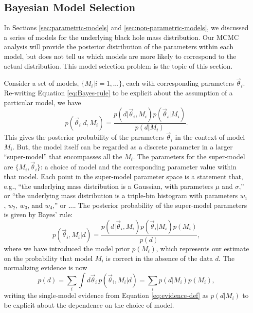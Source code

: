 \documentclass[preprint]{aastex}
\newcommand{\vtheta}{\vec{\theta}}
\begin{document}
\subsection{Bayesian Model Selection}
\label{sec:model-selection}

In Sections \ref{sec:parametric-models} and
\ref{sec:non-parametric-models}, we discussed a series of models for
the underlying black hole mass distribution.  Our MCMC analysis will
provide the posterior distribution of the parameters within each
model, but does not tell us which models are more likely to correspond
to the actual distribution.  This model selection problem is the topic
of this section.

Consider a set of models, $\{M_i| i = 1, \ldots\}$, each with
corresponding parameters $\vtheta_i$.  Re-writing Equation
\eqref{eq:Bayes-rule} to be explicit about the assumption of a
particular model, we have
\begin{equation}
  p(\vtheta_i | d, M_i) = \frac{p(d|\vtheta_i, M_i) p(\vtheta_i | M_i)}{p(d|M_i)}.
\end{equation}
This gives the posterior probability of the parameters $\vtheta_i$ in
the context of model $M_i$.  But, the model itself can be regarded as
a discrete parameter in a larger ``super-model'' that encompasses all
the $M_i$.  The parameters for the super-model are $\{M_i,
\vtheta_i\}$: a choice of model and the corresponding parameter value
within that model.  Each point in the super-model parameter space is a
statement that, e.g., ``the underlying mass distribution is a
Gaussian, with parameters $\mu$ and $\sigma$,'' or ``the underlying
mass distribution is a triple-bin histogram with parameters $w_1$,
$w_2$, $w_3$, and $w_4$,'' or ....  The posterior probability of the
super-model parameters is given by Bayes' rule:
\begin{equation}
  \label{eq:bayes-explicit-model}
  p(\vtheta_i, M_i|d) = \frac{p(d|\vtheta_i, M_i) p(\vtheta_i |M_i) p(M_i)}{p(d)},
\end{equation}
where we have introduced the model prior $p(M_i)$, which represents
our estimate on the probability that model $M_i$ is correct in the
absence of the data $d$.  The normalizing evidence is now
\begin{equation}
  \label{eq:multi-model-evidence-def}
  p(d) = \sum_i \int d\vtheta_i\, p(\vtheta_i, M_i|d) = \sum_i
  p(d|M_i) p(M_i),
\end{equation}
writing the single-model evidence from Equation
\eqref{eq:evidence-def} as $p(d|M_i)$ to be explicit about the
dependence on the choice of model.
\end{document}
